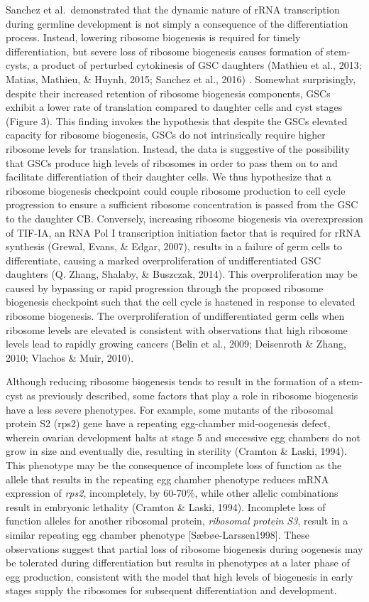 \documentclass[12pt,oneside]{reedthesis}
\begin{document}
Sanchez et al.~demonstrated that the dynamic nature of rRNA
transcription during germline development is not simply a consequence of
the differentiation process. Instead, lowering ribosome biogenesis is
required for timely differentiation, but severe loss of ribosome
biogenesis causes formation of stem-cysts, a product of perturbed
cytokinesis of GSC daughters (Mathieu et al., 2013; Matias, Mathieu, \& Huynh, 2015; Sanchez et al., 2016) . Somewhat surprisingly, despite their increased
retention of ribosome biogenesis components, GSCs exhibit a lower rate
of translation compared to daughter cells and cyst stages (Figure 3).
This finding invokes the hypothesis that despite the GSCs elevated
capacity for ribosome biogenesis, GSCs do not intrinsically require
higher ribosome levels for translation. Instead, the data is suggestive
of the possibility that GSCs produce high levels of ribosomes in order
to pass them on to and facilitate differentiation of their daughter
cells. We thus hypothesize that a ribosome biogenesis checkpoint could
couple ribosome production to cell cycle progression to ensure a
sufficient ribosome concentration is passed from the GSC to the daughter
CB. Conversely, increasing ribosome biogenesis via overexpression of
TIF-IA, an RNA Pol I transcription initiation factor that is required
for rRNA synthesis (Grewal, Evans, \& Edgar, 2007), results in a failure of germ cells
to differentiate, causing a marked overproliferation of undifferentiated
GSC daughters (Q. Zhang, Shalaby, \& Buszczak, 2014). This overproliferation may be caused by
bypassing or rapid progression through the proposed ribosome biogenesis
checkpoint such that the cell cycle is hastened in response to elevated
ribosome biogenesis. The overproliferation of undifferentiated germ
cells when ribosome levels are elevated is consistent with observations
that high ribosome levels lead to rapidly growing cancers
(Belin et al., 2009; Deisenroth \& Zhang, 2010; Vlachos \& Muir, 2010).

Although reducing ribosome biogenesis tends to result in the formation
of a stem-cyst as previously described, some factors that play a role in
ribosome biogenesis have a less severe phenotypes. For example, some
mutants of the ribosomal protein S2 (rps2) gene have a repeating
egg-chamber mid-oogenesis defect, wherein ovarian development halts at
stage 5 and successive egg chambers do not grow in size and eventually
die, resulting in sterility (Cramton \& Laski, 1994). This phenotype may be
the consequence of incomplete loss of function as the allele that
results in the repeating egg chamber phenotype reduces mRNA expression
of \emph{rps2}, incompletely, by 60-70\%, while other allelic combinations
result in embryonic lethality (Cramton \& Laski, 1994). Incomplete loss of
function alleles for another ribosomal protein, \emph{ribosomal protein S3},
result in a similar repeating egg chamber phenotype
{[}Sæbøe-Larssen1998{]}. These observations suggest that partial loss of
ribosome biogenesis during oogenesis may be tolerated during
differentiation but results in phenotypes at a later phase of egg
production, consistent with the model that high levels of biogenesis in
early stages supply the ribosomes for subsequent differentiation and
development.
\end{document}
